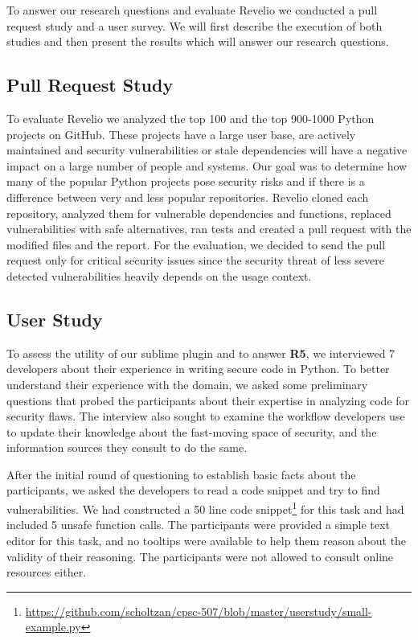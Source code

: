 To answer our research questions and evaluate Revelio we conducted a pull request study and a user survey. We will first describe the execution of both studies and then present the results which will answer our research questions.

\subsection{Pull Request Study}

To evaluate Revelio we analyzed the top 100 and the top 900-1000 Python projects on GitHub. These projects have a large user base, are actively maintained and security vulnerabilities or stale dependencies will have a negative impact on a large number of people and systems. Our goal was to determine how many of the popular Python projects pose security risks and if there is a difference between very and less popular repositories. Revelio cloned each repository, analyzed them for vulnerable dependencies and functions, replaced vulnerabilities with safe alternatives, ran tests and created a pull request with the modified files and the report. For the evaluation, we decided to send the pull request only for critical security issues since the security threat of less severe detected vulnerabilities heavily depends on the usage context.

\subsection{User Study}

To assess the utility of our sublime plugin and to answer \textbf{R5}, we interviewed 7 developers about their experience in writing secure code in Python. To better understand their experience with the domain, we asked some preliminary questions that probed the participants about their expertise in analyzing code for security flaws. The interview also sought to examine the workflow developers use to update their knowledge about the fast-moving space of security, and the information sources they consult to do the same.

After the initial round of questioning to establish basic facts about the participants, we asked the developers to read a code snippet and try to find vulnerabilities. We had constructed a 50 line code snippet\footnote{\url{https://github.com/scholtzan/cpsc-507/blob/master/userstudy/small-example.py}} for this task and had included 5 unsafe function calls. The participants were provided a simple text editor for this task, and no tooltips were available to help them reason about the validity of their reasoning. The participants were not allowed to consult online resources either. 

